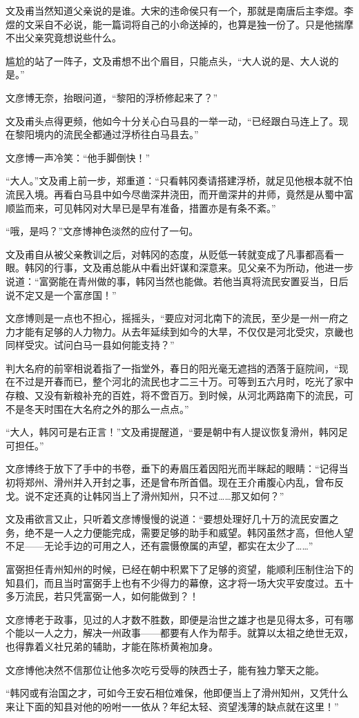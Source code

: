 文及甫当然知道父亲说的是谁。大宋的违命侯只有一个，那就是南唐后主李煜。李煜的文采自不必说，能一篇词将自己的小命送掉的，也算是独一份了。只是他揣摩不出父亲究竟想说些什么。

尴尬的站了一阵子，文及甫想不出个眉目，只能点头，“大人说的是、大人说的是。”

文彦博无奈，抬眼问道，“黎阳的浮桥修起来了？”

文及甫头点得更频，他如今十分关心白马县的一举一动，“已经跟白马连上了。现在黎阳境内的流民全都通过浮桥往白马县去。”

文彦博一声冷笑：“他手脚倒快！”

“大人。”文及甫上前一步，郑重道：“只看韩冈奏请搭建浮桥，就足见他根本就不怕流民入境。再看白马县中如今尽凿深井浇田，而开凿深井的井师，竟然是从蜀中富顺监而来，可见韩冈对大旱已是早有准备，措置亦是有条不紊。”

“哦，是吗？”文彦博神色淡然的应付了一句。

文及甫自从被父亲教训之后，对韩冈的态度，从贬低一转就变成了凡事都高看一眼。韩冈的行事，文及甫总能从中看出奸谋和深意来。见父亲不为所动，他进一步说道：“富弼能在青州做的事，韩冈当然也能做。若他当真将流民安置妥当，日后说不定又是一个富彦国！”

文彦博则是一点也不担心，摇摇头，“要应对河北南下的流民，至少是一州一府之力才能有足够的人力物力。从去年延续到如今的大旱，不仅仅是河北受灾，京畿也同样受灾。试问白马一县如何能支持？”

判大名府的前宰相说着指了一指堂外，春日的阳光毫无遮挡的洒落于庭院间，“现在不过是开春而已，整个河北的流民也才二三十万。可等到五六月时，吃光了家中存粮、又没有新粮补充的百姓，将不啻百万。到时候，从河北两路南下的流民，可不是冬天时围在大名府之外的那么一点点。”

“大人，韩冈可是右正言！”文及甫提醒道，“要是朝中有人提议恢复滑州，韩冈足可担任。”

文彦博终于放下了手中的书卷，垂下的寿眉压着因阳光而半眯起的眼睛：“记得当初将郑州、滑州并入开封之事，还是曾布所首倡。现在王介甫腹心内乱，曾布反戈。说不定还真的让韩冈当上了滑州知州，只不过……那又如何？”

文及甫欲言又止，只听着文彦博慢慢的说道：“要想处理好几十万的流民安置之务，绝不是一人之力便能完成，需要足够的助手和威望。韩冈虽然才高，但他人望不足——无论手边的可用之人，还有震慑僚属的声望，都实在太少了……”

富弼担任青州知州的时候，已经在朝中积累下了足够的资望，能顺利压制住治下的知县们，而且当时富弼手上也有不少得力的幕僚，这才将一场大灾平安度过。五十多万流民，若只凭富弼一人，如何能做到？！

文彦博老于政事，见过的人才数不胜数，即便是治世之雄才也是见得太多，可有哪个能以一人之力，解决一州政事——都要有人作为帮手。就算以太祖之绝世无双，也得靠着义社兄弟的辅助，才能在陈桥黄袍加身。

文彦博他决然不信那位让他多次吃亏受辱的陕西士子，能有独力擎天之能。

“韩冈或有治国之才，可如今王安石相位难保，他即便当上了滑州知州，又凭什么来让下面的知县对他的吩咐一一依从？年纪太轻、资望浅薄的缺点就在这里！”

